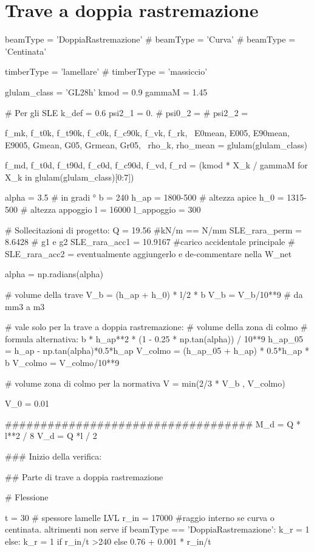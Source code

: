 \section{Trave a doppia rastremazione}
\begin{pycode}[TraveDoppiaRastremazione]
beamType = 'DoppiaRastremazione'
# beamType = 'Curva'
# beamType = 'Centinata'

timberType = 'lamellare'
# timberType = 'massiccio'

glulam_class = 'GL28h'
kmod = 0.9
gammaM = 1.45

# Per gli SLE
k_def = 0.6
psi2_1 = 0.
# psi0_2 =
# psi2_2 =

f_mk, f_t0k, f_t90k, f_c0k, f_c90k, f_vk, f_rk, \
E0mean, E005, E90mean, E9005, Gmean, G05, Grmean, Gr05, \
rho_k, rho_mean = glulam(glulam_class)

f_md, f_t0d, f_t90d, f_c0d, f_c90d, f_vd, f_rd = (kmod * X_k / gammaM for X_k in glulam(glulam_class)[0:7])

alpha = 3.5 # in gradi °
b = 240
h_ap = 1800-500 # altezza apice
h_0 = 1315-500 # altezza appoggio
l = 16000 
l_appoggio = 300

# Sollecitazioni di progetto:
Q = 19.56 #kN/m == N/mm
SLE_rara_perm = 8.6428 # g1 e g2
SLE_rara_acc1 = 10.9167 #carico accidentale principale
# SLE_rara_acc2 =  eventualmente aggiungerlo e de-commentare nella W_net

alpha = np.radians(alpha)

# volume della trave 
V_b = (h_ap + h_0) * l/2 * b 
V_b = V_b/10**9 # da mm3 a m3

# vale solo per la trave a doppia rastremazione:
# volume della zona di colmo
# formula alternativa: b * h_ap**2 * (1 - 0.25 * np.tan(alpha)) / 10**9
h_ap_05 = h_ap - np.tan(alpha)*0.5*h_ap
V_colmo =  (h_ap_05 + h_ap) * 0.5*h_ap * b
V_colmo = V_colmo/10**9

# volume zona di colmo per la normativa
V = min(2/3 * V_b , V_colmo)

V_0 = 0.01


###################################
M_d = Q * l**2 / 8
V_d = Q *l / 2

### Inizio della verifica:

## Parte di trave a doppia rastremazione

# Flessione

t = 30 # spessore lamelle LVL
r_in = 17000 #raggio interno se curva o centinata. altrimenti non serve
if beamType == 'DoppiaRastremazione':
    k_r = 1
else:
    k_r = 1 if r_in/t >240 else 0.76 + 0.001 * r_in/t


\end{pycode}
